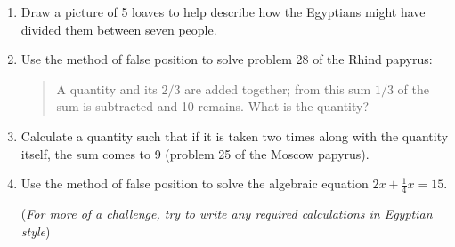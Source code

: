 \begin{exercises*}{}{}
\begin{enumerate}
	  
	  
	  
	  \item Draw a picture of 5 loaves to help describe how the Egyptians might have divided them between seven people.
	  
	  
	  \item%
	  Use the method of false position to solve problem 28 of the Rhind papyrus:
	  \begin{quote}
	  	A quantity and its $2/3$ are added together; from this sum $1/3$ of the sum is subtracted and 10 remains. What is the quantity?
	  \end{quote}
	  

	  \item %
	  Calculate a quantity such that if it is taken two times along with the quantity itself, the sum comes to 9  (problem 25 of the Moscow papyrus).
	  
	  
	  \item Use the method of false position to solve the algebraic equation $2x+\frac 14x=15$.\par
	  (\emph{For more of a challenge, try to write any required calculations in Egyptian style})
	  



\end{enumerate}
\end{exercises*}
